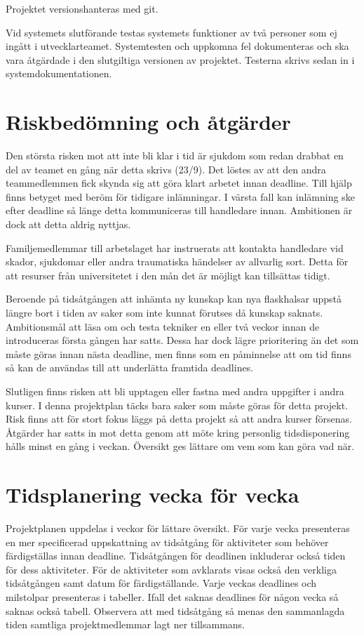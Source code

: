 \documentclass{TDP003mall}
\begin{document}
Projektet versionshanteras med git.

Vid systemets slutförande testas systemets funktioner av två personer som ej ingått i utvecklarteamet.
Systemtesten och uppkomna fel dokumenteras och ska vara åtgärdade i den slutgiltiga versionen av projektet.
Testerna skrivs sedan in i systemdokumentationen.

\section{Riskbedömning och åtgärder}
Den största risken mot att inte bli klar i tid är sjukdom som redan drabbat en del av teamet en gång när detta skrivs (23/9). Det löstes av att den andra teammedlemmen fick skynda sig att göra klart arbetet innan deadline. Till hjälp finns betyget med beröm för tidigare inlämningar. I värsta fall kan inlämning ske efter deadline så länge detta kommuniceras till handledare innan. Ambitionen är dock att detta aldrig nyttjas.

Familjemedlemmar till arbetslaget har instruerats att kontakta handledare vid skador, sjukdomar eller andra traumatiska händelser av allvarlig sort. Detta för att resurser från universitetet i den mån det är möjligt kan tillsättas tidigt.

Beroende på tidsåtgången att inhämta ny kunskap kan nya flaskhalsar uppstå längre bort i tiden av saker som inte kunnat förutses då kunskap saknats. Ambitionsmål att läsa om och testa tekniker en eller två veckor innan de introduceras första gången har satts. Dessa har dock lägre prioritering än det som måste göras innan nästa deadline, men finns som en påminnelse att om tid finns så kan de användas till att underlätta framtida deadlines.

Slutligen finns risken att bli upptagen eller fastna med andra uppgifter i andra kurser. I denna projektplan täcks bara saker som måste göras för detta projekt. Risk finns att för stort fokus läggs på detta projekt så att andra kurser försenas. Åtgärder har satts in mot detta genom att möte kring personlig tidsdisponering hålls minst en gång i veckan. Översikt ges lättare om vem som kan göra vad när.

\section{Tidsplanering vecka för vecka}
Projektplanen uppdelas i veckor för lättare översikt. För varje vecka presenteras
 en mer specificerad uppskattning av tidsåtgång för aktiviteter som behöver färdigställas innan deadline. Tidsåtgången för deadlinen inkluderar också tiden för dess
 aktiviteter. För de aktiviteter som avklarats visas också den verkliga tidsåtgången
 samt datum för färdigställande. Varje veckas deadlines och milstolpar presenteras
 i tabeller. Ifall det saknas deadlines för någon vecka så saknas också tabell. Observera att med tidsåtgång så menas den sammanlagda tiden samtliga projektmedlemmar lagt ner tillsammans.
\end{document}
